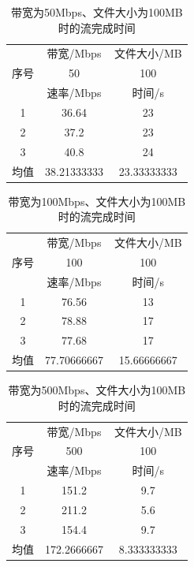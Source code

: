 \documentclass[UTF8]{article}
\begin{document}
\begin{table}[H]
  \centering
  \caption{带宽为50Mbps、文件大小为100MB时的流完成时间}
  \begin{tabular}{|c|c|c|}
    \hline
    \multirow{3}{*}{序号}&带宽/Mbps&文件大小/MB\\
    \cline{2-3}
    &50&100\\
    \cline{2-3}
    &速率/Mbps&时间/s\\
    \hline
    1&36.64&23\\
    \hline
    2&37.2&23\\
    \hline
    3&40.8&24\\
    \hline
    均值&38.21333333&23.33333333\\
    \hline
  \end{tabular}
\end{table}

\begin{table}[H]
  \centering
  \caption{带宽为100Mbps、文件大小为100MB时的流完成时间}
  \begin{tabular}{|c|c|c|}
    \hline
    \multirow{3}{*}{序号}&带宽/Mbps&文件大小/MB\\
    \cline{2-3}
    &100&100\\
    \cline{2-3}
    &速率/Mbps&时间/s\\
    \hline
    1&76.56&13\\
    \hline
    2&78.88&17\\
    \hline
    3&77.68&17\\
    \hline
    均值&77.70666667&15.66666667\\
    \hline
  \end{tabular}
\end{table}

\begin{table}[H]
  \centering
  \caption{带宽为500Mbps、文件大小为100MB时的流完成时间}
  \begin{tabular}{|c|c|c|}
    \hline
    \multirow{3}{*}{序号}&带宽/Mbps&文件大小/MB\\
    \cline{2-3}
    &500&100\\
    \cline{2-3}
    &速率/Mbps&时间/s\\
    \hline
    1&151.2&9.7\\
    \hline
    2&211.2&5.6\\
    \hline
    3&154.4&9.7\\
    \hline
    均值&172.2666667&8.333333333\\
    \hline
  \end{tabular}
\end{table}
\end{document}

